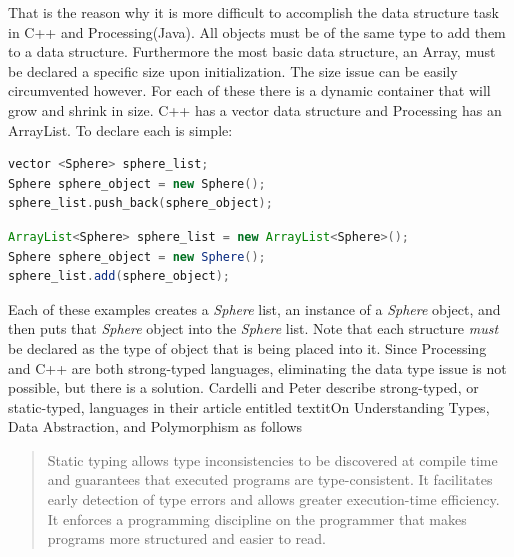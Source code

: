 That is the reason why it is more difficult to accomplish the data structure task in C++ and Processing(Java).  All objects must be of the same type to add them to a data structure.  Furthermore the most basic data structure, an Array, must be declared a specific size upon initialization.  The size issue can be easily circumvented however.  For each of these there is a dynamic container that will grow and shrink in size. C++ has a vector data structure and Processing has an ArrayList. To declare each is simple:
\begin{lstlisting}[language=C++, caption=C++ Vector Example, style=mystyle]
vector <Sphere> sphere_list;
Sphere sphere_object = new Sphere();
sphere_list.push_back(sphere_object);
\end{lstlisting}
\begin{lstlisting}[language=Java, caption=Java ArrayList Example, style=mystyle]
ArrayList<Sphere> sphere_list = new ArrayList<Sphere>();
Sphere sphere_object = new Sphere();
sphere_list.add(sphere_object);
\end{lstlisting}
Each of these examples creates a \textit{Sphere} list, an instance of a \textit{Sphere} object, and then puts that \textit{Sphere} object into the \textit{Sphere} list.  Note that each structure \textit{must} be declared as the type of object that is being placed into it.  Since Processing and C++ are both strong-typed languages, eliminating the data type issue is not possible, but there is a solution.  Cardelli and Peter describe strong-typed, or static-typed, languages in their article entitled textit{On Understanding Types, Data Abstraction, and Polymorphism} as follows
\begin{quote}
Static typing allows type inconsistencies to be discovered at compile time and guarantees that executed programs are type-consistent. It facilitates early detection of type errors and allows greater execution-time efficiency. It enforces a programming discipline on the programmer that makes programs more structured and easier to read. \cite{cardelli1985understanding}
\end{quote}

